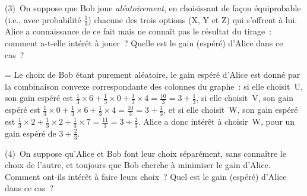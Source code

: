\documentclass[12pt,a4paper]{article}
\theoremstyle{definition}
\newif\ifcorrige
\newenvironment{corrige}%
{\ifcorrige\relax\else\setbox0=\vbox\bgroup\fi%
\smallbreak\noindent{\underbar{\textit{Corrigé.}}\quad}}
{{\hbox{}\nobreak\hfill\checkmark}%
\ifcorrige\relax\else\egroup\fi\par}
\begin{document}
\smallbreak

(3) On suppose que Bob joue \emph{aléatoirement}, en choisissant de
façon équiprobable (i.e., avec probabilité $\frac{1}{3}$) chacune des
trois options (X, Y et Z) qui s'offrent à lui.  Alice a connaissance
de ce fait mais ne connaît pas le résultat du tirage : comment
a-t-elle intérêt à jouer ?  Quelle est le gain (espéré) d'Alice dans
ce cas ?

\begin{corrige}
Le choix de Bob étant purement aléatoire, le gain espéré d'Alice est
donné par la combinaison convexe correspondante des colonnes du
graphe : si elle choisit U, son gain espéré est $\frac{1}{3}\times 6 +
\frac{1}{3}\times 0 + \frac{1}{3}\times 4 = \frac{10}{3} = 3 +
\frac{1}{3}$, si elle choisit V, son gain espéré est
$\frac{1}{3}\times 0 + \frac{1}{3}\times 6 + \frac{1}{3}\times 4 =
\frac{10}{3} = 3 + \frac{1}{3}$, et si elle choisit W, son gain espéré
est $\frac{1}{3}\times 2 + \frac{1}{3}\times 2 + \frac{1}{3}\times 7 =
\frac{11}{3} = 3 + \frac{2}{3}$.  Alice a donc intérêt à choisir W,
pour un gain espéré de $3 + \frac{2}{3}$.
\end{corrige}

\smallbreak

(4) On suppose qu'Alice et Bob font leur choix séparément, sans
connaître le choix de l'autre, et toujours que Bob cherche à minimiser
le gain d'Alice.  Comment ont-ils intérêt à faire leurs choix ?  Quel
est le gain (espéré) d'Alice dans ce cas ?
\end{document}

